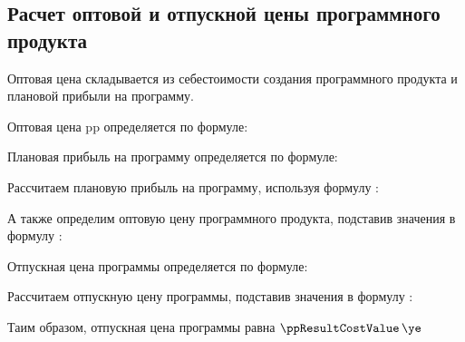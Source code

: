 \subsection{Расчет оптовой и отпускной цены программного продукта}
\label{sec:economics:ppoptcost}

Оптовая цена складывается из себестоимости создания программного продукта и плановой прибыли на программу.

Оптовая цена \gls{pp} определяется по формуле:
\ppOptPriceEquation

Плановая прибыль на программу определяется по формуле:
\plannedSoftIncomeEquation

Рассчитаем плановую прибыль на программу, используя формулу :
\plannedSoftIncomeFormulaApplied

А также определим оптовую цену программного продукта, подставив значения в формулу :
\ppOptPriceFormulaApplied

Отпускная цена программы определяется по формуле:
\ppResultCostEquation

Рассчитаем отпускную цену программы, подставив значения в формулу :
\ppResultCostFormulaApplied

Таим образом, отпускная цена программы равна \(\ppResultCostValue \, \ye\)